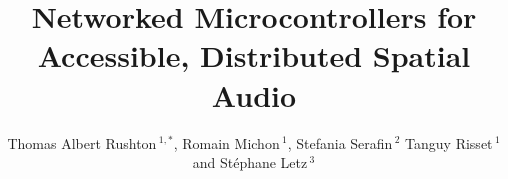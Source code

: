 \documentclass[utf8]{FrontiersinHarvard}
\def\firstAuthorLast{Rushton {et~al.}}
\def\Authors{Thomas Albert Rushton\,$^{1,*}$, Romain Michon\,$^{1}$, Stefania
Serafin\,$^{2}$ Tanguy Risset\,$^{1}$ and Stéphane Letz\,$^{3}$}
\begin{document}
    \onecolumn

    \title[Networked Microcontrollers for Accessible, Distributed Spatial Audio]
    {Networked Microcontrollers for Accessible, Distributed Spatial Audio}

    \author[\firstAuthorLast ]{\Authors}
    \address{}
    \correspondance{}

    \extraAuth{}

    \maketitle
\end{document}
